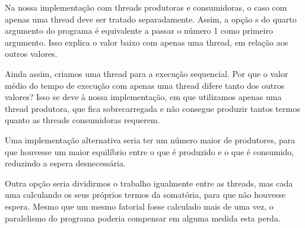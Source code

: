 \documentclass[a4paper,11pt]{article} %
\begin{document}
  \pagebreak 
  \par  Na nossa implementação com threads produtoras e consumidoras, o caso com apenas uma thread deve ser tratado separadamente.
  Assim, a opção s do quarto argumento do programa é equivalente a passar o número 1 como primeiro argumento.
  Isso explica o valor baixo com apenas uma thread, em relação aos outros valores.
  \par
  Ainda assim, criamos uma thread para a execução sequencial. Por que o valor médio do tempo de execução com apenas uma thread
  difere tanto dos outros valores? Isso se deve à nossa implementação, em que utilizamos apenas uma thread produtora, que fica sobrecarregada
  e não consegue produzir tantos termos quanto as threads consumidoras requerem. 
  \par Uma implementação alternativa seria ter um número maior de produtores, para que houvesse um maior equilíbrio
  entre o que é produzido e o que é consumido, reduzindo a espera desnecessária.
  \par Outra opção seria dividirmos o trabalho igualmente entre as threads, mas cada uma calculando os seus próprios termos da somatória, 
  para que não houvesse espera. Mesmo que um mesmo fatorial fosse calculado mais de uma vez, o paralelismo do programa poderia
  compensar em alguma medida esta perda.
  
\end{document}
